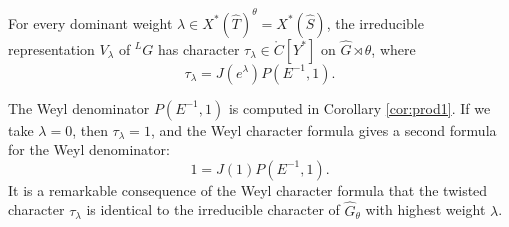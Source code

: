 \begin{theorem}  
  For every dominant weight $\lambda\in X^*(\hat T)^\theta = X^*(\hat
  S)$,  the irreducible representation $V_\lambda$ of ${}^LG$ has
  character $\tau_\lambda\in \ring{C}[Y^*]$ on $\hat G\rtimes \theta$,
  where
\[
\tau_\lambda = J(e^\lambda) P(E^{-1},1).
\]
\end{theorem}


The Weyl denominator $P(E^{-1},1)$ is computed in Corollary
\ref{cor:prod1}.  If we take $\lambda=0$, then $\tau_\lambda=1$, and
the Weyl character formula gives a second formula for the Weyl
denominator:
\begin{equation}\label{eqn:wd2}
1= J(1) P(E^{-1},1).
\end{equation}
It is a remarkable consequence of the Weyl character formula that the
twisted character $\tau_\lambda$ is identical to the irreducible
character of $\hat G_\theta$ with highest weight $\lambda$.


